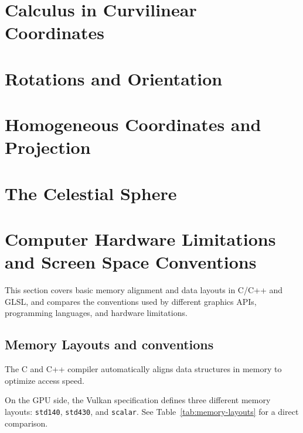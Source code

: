 \section{Calculus in Curvilinear Coordinates}\label{sec:calculus-in-curvilinear-coordinates}

\section{Rotations and Orientation}\label{sec:rotations-and-orientation}

\section{Homogeneous Coordinates and Projection}\label{sec:homogeneous-coordinates-and-projection}

\section{The Celestial Sphere\optmark}\label{sec:the-celestial-sphere}


\section{Computer Hardware Limitations and Screen Space Conventions}\label{sec:computer-hardware-limitations-and-screen-space-conventions}

This section covers basic memory alignment and data layouts in C/C++ and GLSL, 
and compares the conventions used by different graphics APIs, programming languages, and hardware limitations.

\subsection{Memory Layouts and conventions}\label{subsec:memory-layouts}

The C and C++ compiler automatically aligns data structures in memory to optimize access speed.

On the GPU side, the Vulkan specification defines three different memory layouts: 
\texttt{std140}, \texttt{std430}, and \texttt{scalar}. See Table~\ref{tab:memory-layouts} for a direct comparison.


